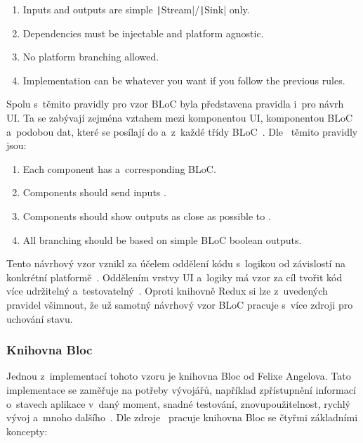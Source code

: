 \begin{enumerate}
    \item Inputs and outputs are simple
    \texttt|Stream|/\texttt|Sink| only.
    \item Dependencies must be injectable and platform agnostic.
    \item No platform branching allowed.
    \item Implementation can be whatever you want
    if you follow the previous rules.
\end{enumerate}

Spolu s~těmito pravidly pro vzor BLoC byla představena
pravidla i~pro návrh UI.
Ta se zabývají zejména vztahem mezi komponentou UI, komponentou BLoC
a~podobou dat,
které se posílají do a~z~každé třídy BLoC~\cite{googledevelopers_bloc}.
Dle~\cite{googledevelopers_bloc} těmito pravidly jsou:

\begin{enumerate}
    \item Each  component has a~corresponding BLoC.
    \item Components should send inputs .
    \item Components should show outputs as close as possible to .
    \item All branching should be based on simple BLoC boolean outputs.
\end{enumerate}

Tento návrhový vzor vznikl za účelem oddělení kódu s~logikou
od závislostí na konkrétní platformě~\cite{googledevelopers_bloc}.
Oddělením vrstvy UI a~logiky má vzor za cíl tvořit kód více udržitelný
a~testovatelný~\cite{flutterando_analyzing_bloc_mobx}.
Oproti knihovně Redux si lze z~uvedených pravidel všimnout,
že už samotný návrhový vzor BLoC pracuje s~více zdroji pro uchování stavu.

\subsubsection{Knihovna Bloc}

Jednou z~implementací tohoto vzoru je knihovna Bloc od Felixe
Angelova.
Tato implementace se zaměřuje na potřeby vývojářů,
například zpřístupnění informací o~stavech aplikace v~daný moment,
snadné testování, znovupoužitelnost, rychlý vývoj a~mnoho dalšího~\cite{bloclibrary_whybloc}. 
Dle zdroje~\cite{bloclibrary_coreconcepts} pracuje knihovna Bloc se čtyřmi
základními koncepty: 

